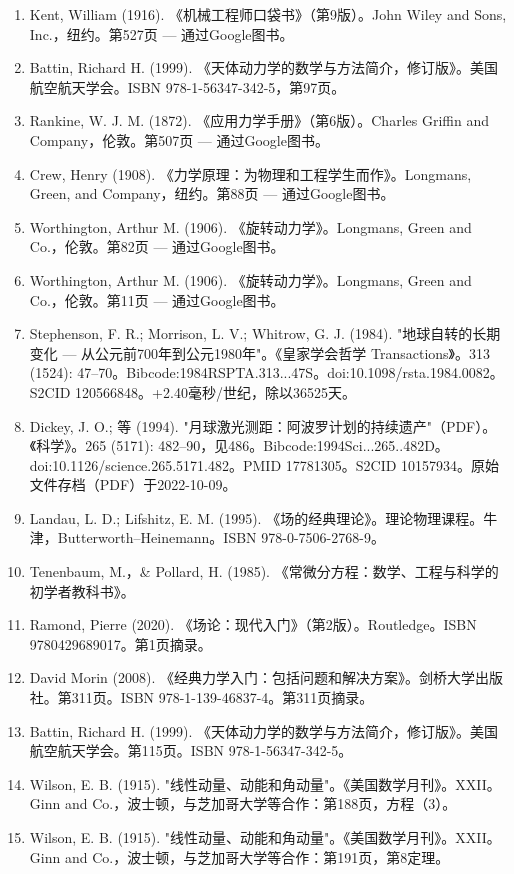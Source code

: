 \begin{enumerate}
\item Kent, William (1916). 《机械工程师口袋书》（第9版）。John Wiley and Sons, Inc.，纽约。第527页 — 通过Google图书。
\item Battin, Richard H. (1999). 《天体动力学的数学与方法简介，修订版》。美国航空航天学会。ISBN 978-1-56347-342-5，第97页。
\item Rankine, W. J. M. (1872). 《应用力学手册》（第6版）。Charles Griffin and Company，伦敦。第507页 — 通过Google图书。
\item Crew, Henry (1908). 《力学原理：为物理和工程学生而作》。Longmans, Green, and Company，纽约。第88页 — 通过Google图书。
\item Worthington, Arthur M. (1906). 《旋转动力学》。Longmans, Green and Co.，伦敦。第82页 — 通过Google图书。
\item Worthington, Arthur M. (1906). 《旋转动力学》。Longmans, Green and Co.，伦敦。第11页 — 通过Google图书。
\item Stephenson, F. R.; Morrison, L. V.; Whitrow, G. J. (1984). "地球自转的长期变化 — 从公元前700年到公元1980年"。《皇家学会哲学 Transactions》。313 (1524): 47–70。Bibcode:1984RSPTA.313...47S。doi:10.1098/rsta.1984.0082。S2CID 120566848。+2.40毫秒/世纪，除以36525天。
\item Dickey, J. O.; 等 (1994). "月球激光测距：阿波罗计划的持续遗产"（PDF）。《科学》。265 (5171): 482–90，见486。Bibcode:1994Sci...265..482D。doi:10.1126/science.265.5171.482。PMID 17781305。S2CID 10157934。原始文件存档（PDF）于2022-10-09。
\item Landau, L. D.; Lifshitz, E. M. (1995). 《场的经典理论》。理论物理课程。牛津，Butterworth–Heinemann。ISBN 978-0-7506-2768-9。
\item Tenenbaum, M.，& Pollard, H. (1985). 《常微分方程：数学、工程与科学的初学者教科书》。
\item Ramond, Pierre (2020). 《场论：现代入门》（第2版）。Routledge。ISBN 9780429689017。第1页摘录。
\item David Morin (2008). 《经典力学入门：包括问题和解决方案》。剑桥大学出版社。第311页。ISBN 978-1-139-46837-4。第311页摘录。
\item Battin, Richard H. (1999). 《天体动力学的数学与方法简介，修订版》。美国航空航天学会。第115页。ISBN 978-1-56347-342-5。
\item Wilson, E. B. (1915). "线性动量、动能和角动量"。《美国数学月刊》。XXII。Ginn and Co.，波士顿，与芝加哥大学等合作：第188页，方程（3）。
\item Wilson, E. B. (1915). "线性动量、动能和角动量"。《美国数学月刊》。XXII。Ginn and Co.，波士顿，与芝加哥大学等合作：第191页，第8定理。

\end{enumerate}
